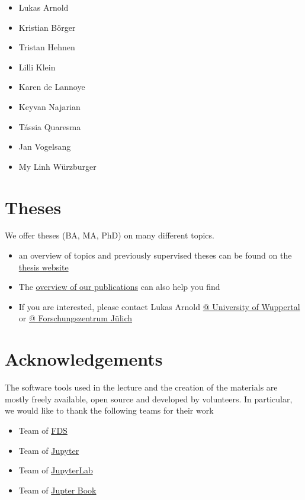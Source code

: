 \documentclass[
  letterpaper,
  DIV=11,
  numbers=noendperiod]{scrreprt}
\providecommand{\tightlist}{%
  \setlength{\itemsep}{0pt}\setlength{\parskip}{0pt}}\usepackage{longtable,booktabs,array}
\begin{document}
\begin{itemize}
\tightlist
\item
  Lukas Arnold
\item
  Kristian Börger
\item
  Tristan Hehnen
\item
  Lilli Klein
\item
  Karen de Lannoye
\item
  Keyvan Najarian
\item
  Tássia Quaresma
\item
  Jan Vogelsang
\item
  My Linh Würzburger
\end{itemize}

\section*{Theses}\label{theses}


We offer theses (BA, MA, PhD) on many different topics.

\begin{itemize}
\tightlist
\item
  an overview of topics and previously supervised theses can be found on
  the \href{https://cce.uni-wuppertal.de/en/theses/}{thesis website}
\item
  The \href{https://cce.uni-wuppertal.de/en/research/}{overview of our
  publications} can also help you find
\item
  If you are interested, please contact Lukas Arnold
  \href{https://cce.uni-wuppertal.de/en/team/}{@ University of
  Wuppertal} or
  \href{https://www.fz-juelich.de/ias/ias-7/EN/AboutUs/Staff/Current/Arnold_Lukas/main.html}{@
  Forschungszentrum Jülich}
\end{itemize}

\section*{Acknowledgements}\label{acknowledgements}


The software tools used in the lecture and the creation of the materials
are mostly freely available, open source and developed by volunteers. In
particular, we would like to thank the following teams for their work

\begin{itemize}
\tightlist
\item
  Team of \href{https://github.com/firemodels/fds}{FDS}
\item
  Team of \href{https://github.com/jupyter/jupyter}{Jupyter}
\item
  Team of \href{https://github.com/jupyterlab}{JupyterLab}
\item
  Team of \href{https://github.com/jupyter/jupyter-book}{Jupter Book}
\end{itemize}
\end{document}
